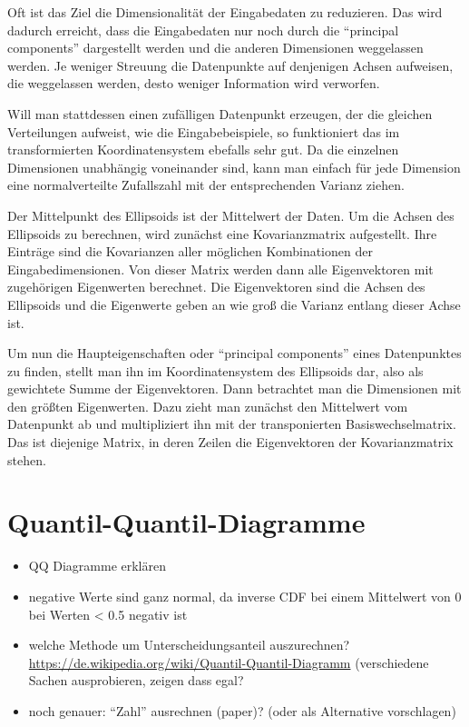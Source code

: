  Oft ist das Ziel die Dimensionalität der Eingabedaten zu reduzieren. Das wird dadurch erreicht, dass die Eingabedaten nur noch durch die "`principal components"' dargestellt werden und die anderen Dimensionen weggelassen werden. Je weniger Streuung die Datenpunkte auf denjenigen Achsen aufweisen, die weggelassen werden, desto weniger Information wird verworfen.
 
 Will man stattdessen einen zufälligen Datenpunkt erzeugen, der die gleichen Verteilungen aufweist, wie die Eingabebeispiele, so funktioniert das im transformierten Koordinatensystem ebefalls sehr gut. Da die einzelnen Dimensionen unabhängig voneinander sind, kann man einfach für jede Dimension eine normalverteilte Zufallszahl mit der entsprechenden Varianz ziehen.
 
 Der Mittelpunkt des Ellipsoids ist der Mittelwert der Daten.
 Um die Achsen des Ellipsoids zu berechnen, wird zunächst eine Kovarianzmatrix aufgestellt. Ihre Einträge sind die Kovarianzen aller möglichen Kombinationen der Eingabedimensionen. Von dieser Matrix werden dann alle Eigenvektoren mit zugehörigen Eigenwerten berechnet.
 Die Eigenvektoren sind die Achsen des Ellipsoids und die Eigenwerte geben an wie groß die Varianz entlang dieser Achse ist.
 
 Um nun die Haupteigenschaften oder "`principal components"' eines Datenpunktes zu finden, stellt man ihn im Koordinatensystem des Ellipsoids dar, also als gewichtete Summe der Eigenvektoren. Dann betrachtet man die Dimensionen mit den größten Eigenwerten. Dazu zieht man zunächst den Mittelwert vom Datenpunkt ab und multipliziert ihn mit der transponierten Basiswechselmatrix. Das ist diejenige Matrix, in deren Zeilen die Eigenvektoren der Kovarianzmatrix stehen.

 
\section{Quantil-Quantil-Diagramme} 
\label{qqdiagrams}

 \begin{itemize}
  \item QQ Diagramme erklären
  \item negative Werte sind ganz normal, da inverse CDF bei einem Mittelwert von 0 bei Werten < 0.5 negativ ist
  \item welche Methode um Unterscheidungsanteil auszurechnen? \url{https://de.wikipedia.org/wiki/Quantil-Quantil-Diagramm} (verschiedene Sachen ausprobieren, zeigen dass egal?
  \item noch genauer: "`Zahl"' ausrechnen (paper)? (oder als Alternative vorschlagen)
 \end{itemize}


